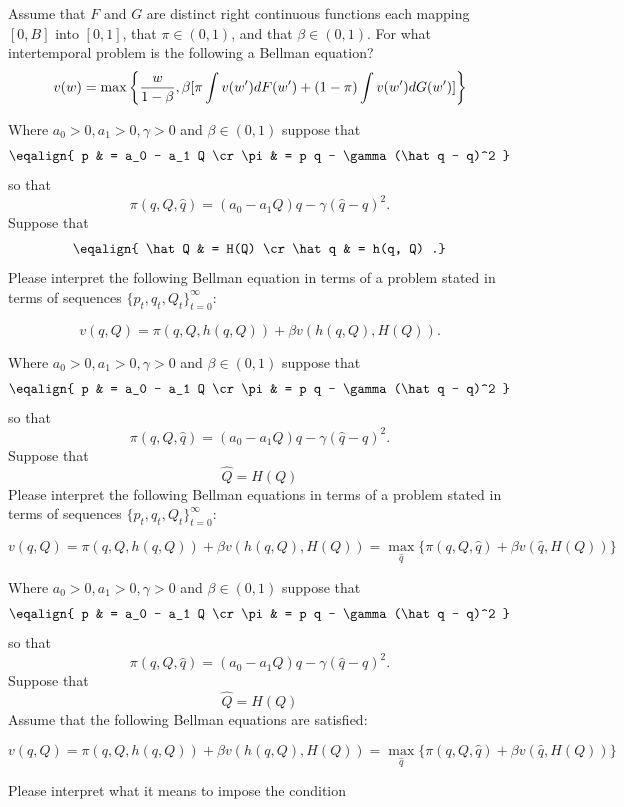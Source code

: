 \medskip



  Assume that  $F$ and $G$ are distinct  right continuous functions each mapping $[0, B]$ into $[0,1]$, that $\pi \in (0,1)$, and  that $\beta \in (0,1)$. For what intertemporal problem is the following a Bellman equation?
$$ v(w) = \max\left\{ {w\over{1-\beta}},  \beta [  \pi \int v(w') d F(w') + (1-\pi) \int v(w') d G(w') ]  \right\} $$


\medskip

 Where $a_0 >0, a_1> 0, \gamma > 0$ and $\beta \in (0,1)$ suppose that
$$\eqalign{ p & = a_0 - a_1 Q \cr
           \pi &  = p q - \gamma(\hat q - q)^2 } $$
so that
$$ \pi(q, Q, \hat q) = (a_0 - a_1 Q)  q - \gamma (\hat q - q)^2 .$$
Suppose that
$$ \eqalign{ \hat Q & = H(Q) \cr
            \hat q & = h(q, Q) .} $$
Please interpret the following Bellman equation in terms of a problem stated in terms of sequences  $\{p_t, q_t, Q_t\}_{t=0}^\infty$:

$$ v(q, Q) = \pi(q,Q, h(q,Q)) + \beta v\left(h(q,Q), H(Q)\right) .$$

\medskip


 Where $a_0 >0, a_1> 0, \gamma > 0$ and $\beta \in (0,1)$ suppose that
$$\eqalign{ p & = a_0 - a_1 Q \cr
           \pi &  = p q - \gamma(\hat q - q)^2 } $$
so that
$$ \pi(q, Q, \hat q) = (a_0 - a_1 Q) q - \gamma (\hat q - q)^2 .$$
Suppose that
$$ \hat Q  = H(Q)  $$
Please interpret the following Bellman equations in terms of a problem stated in terms of sequences  $\{p_t, q_t, Q_t\}_{t=0}^\infty$:

$$ v(q, Q) = \pi(q,Q, h(q, Q) ) + \beta v\left(h(q,Q), H(Q)\right) = \max_{\hat q} \{\pi(q, Q, \hat q) + \beta v(\hat q, H(Q) )   \} $$

\medskip

 Where $a_0 >0, a_1> 0, \gamma > 0$ and $\beta \in (0,1)$ suppose that
$$\eqalign{ p & = a_0 - a_1 Q \cr
           \pi &  = p q - \gamma(\hat q - q)^2 } $$
so that
$$ \pi(q, Q, \hat q) = (a_0 - a_1 Q) q- \gamma (\hat q - q)^2 .$$
Suppose that
$$ \hat Q  = H(Q)  $$
Assume that the following Bellman equations are satisfied: %

$$ v(q, Q) = \pi(q,Q, h(q,Q)) + \beta v\left(h(q,Q), H(Q)\right) = \max_{\hat q} \{\pi(q, Q, \hat q) + \beta v(\hat q, H(Q) )   \} $$

\noindent Please interpret what it means to impose the condition

